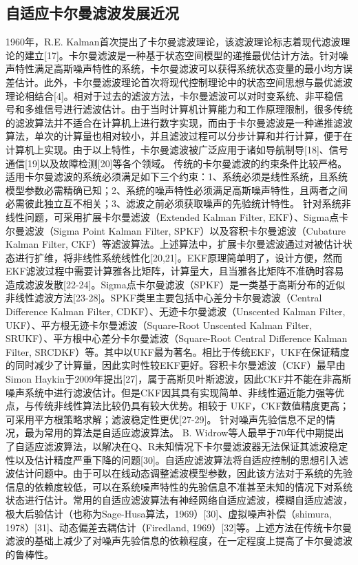 \subsection{自适应卡尔曼滤波发展近况}

1960年，R.E. Kalman首次提出了卡尔曼滤波理论，该滤波理论标志着现代滤波理论的建立[17]。卡尔曼滤波是一种基于状态空间模型的递推最优估计方法。针对噪声特性满足高斯噪声特性的系统，卡尔曼滤波可以获得系统状态变量的最小均方误差估计。此外，卡尔曼滤波理论首次将现代控制理论中的状态空间思想与最优滤波理论相结合[4]。相对于过去的滤波方法，卡尔曼滤波可以对时变系统、非平稳信号和多维信号进行滤波估计。由于当时计算机计算能力和工作原理限制，很多传统的滤波算法并不适合在计算机上进行数字实现，而由于卡尔曼滤波是一种递推滤波算法，单次的计算量也相对较小，并且滤波过程可以分步计算和并行计算，便于在计算机上实现。由于以上特性，卡尔曼滤波被广泛应用于诸如导航制导[18]、信号通信[19]以及故障检测[20]等各个领域。
传统的卡尔曼滤波的约束条件比较严格。适用卡尔曼滤波的系统必须满足如下三个约束：1、系统必须是线性系统，且系统模型参数必需精确已知；2、系统的噪声特性必须满足高斯噪声特性，且两者之间必需彼此独立互不相关；3、滤波之前必须获取噪声的先验统计特性。
针对系统非线性问题，可采用扩展卡尔曼滤波（Extended Kalman Filter, EKF）、Sigma点卡尔曼滤波（Sigma Point Kalman Filter, SPKF）以及容积卡尔曼滤波（Cubature Kalman Filter, CKF）等滤波算法。上述算法中，扩展卡尔曼滤波通过对被估计状态进行扩维，将非线性系统线性化[20,21]。EKF原理简单明了，设计方便，然而EKF滤波过程中需要计算雅各比矩阵，计算量大，且当雅各比矩阵不准确时容易造成滤波发散[22-24]。Sigma点卡尔曼滤波（SPKF）是一类基于高斯分布的近似非线性滤波方法[23-28]。SPKF类里主要包括中心差分卡尔曼滤波（Central Difference Kalman Filter, CDKF）、无迹卡尔曼滤波（Unscented Kalman Filter, UKF）、平方根无迹卡尔曼滤波（Square-Root Unscented Kalman Filter, SRUKF）、平方根中心差分卡尔曼滤波（Square-Root Central Difference Kalman Filter, SRCDKF）等。其中以UKF最为著名。相比于传统EKF，UKF在保证精度的同时减少了计算量，因此实时性较EKF更好。容积卡尔曼滤波（CKF）最早由Simon Haykin于2009年提出[27]，属于高斯贝叶斯滤波，因此CKF并不能在非高斯噪声系统中进行滤波估计。但是CKF因其具有实现简单、非线性逼近能力强等优点，与传统非线性算法比较仍具有较大优势。相较于 UKF，CKF数值精度更高；可采用平方根策略求解；滤波稳定性更优[27-29]。
针对噪声先验信息不足的情况，最为常用的算法是自适应滤波算法。
B. Widrow等人最早于70年代中期提出了自适应滤波算法，以解决在Q、R未知情况下卡尔曼滤波器无法保证其滤波稳定性以及估计精度严重下降的问题[30]。自适应滤波算法将自适应控制的思想引入滤波估计问题中。由于可以在线动态调整滤波模型参数，因此该方法对于系统的先验信息的依赖度较低，可以在系统噪声特性的先验信息不准甚至未知的情况下对系统状态进行估计。常用的自适应滤波算法有神经网络自适应滤波，模糊自适应滤波，极大后验估计（也称为Sage-Husa算法，1969）[30]、虚拟噪声补偿（shimura, 1978）[31]、动态偏差去耦估计（Firedland, 1969）[32]等。上述方法在传统卡尔曼滤波的基础上减少了对噪声先验信息的依赖程度，在一定程度上提高了卡尔曼滤波的鲁棒性。
